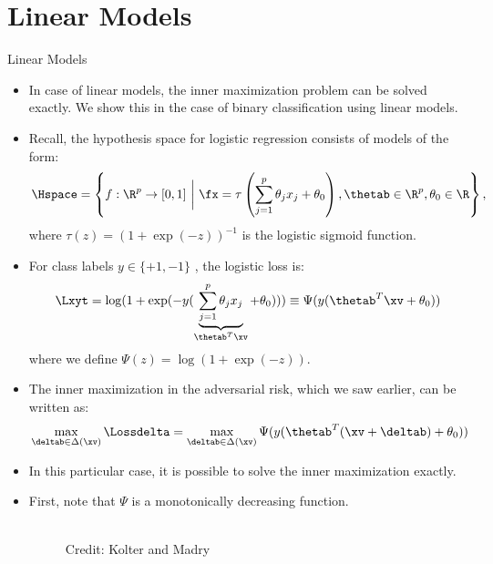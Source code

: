 \section{Linear Models}
\begin{vbframe} {Linear Models}
  \begin{itemize}
    \item In case of linear models, the inner maximization problem can be solved exactly. We show this in the case of binary classification using linear models.
    \item Recall, the hypothesis space for logistic regression consists of models of the form:
          \small
          $$\Hspace = \left\{f: \R^p \to [0, 1] ~\bigg|~ \fx = \tau\left(\sum_{j = 1}^p \theta_j x_j + \theta_0 \right), \thetab \in \R^p, \theta_0 \in \R \right\},$$
          \normalsize
          where $\tau(z) = (1 + \exp(-z))^{-1}$ is the logistic sigmoid function. 
    \item For class labels $y \in \{+1,-1\}$ , the logistic loss is:
          \small
          $$\Lxyt = \log(1 + \exp(- {y (\underbrace{\sum_{j = 1}^p \theta_j x_j}_{\thetab^T\xv} + \theta_0))}) \equiv \Psi(y (\thetab^T\xv + \theta_0))$$
          \normalsize
          where we define $\Psi(z) = \log(1+\exp(-z))$.
  \end{itemize}

\framebreak

  \begin{itemize}
    \item The inner maximization in the adversarial risk, which we saw earlier, can be written as:
    $$\max_{\deltab \in \Delta(\xv)} \Lossdelta = \max_{\deltab \in \Delta(\xv)} \Psi(y (\thetab^T(\xv + \deltab) + \theta_0)) $$
    \item In this particular case, it is possible to solve the inner maximization exactly.
    \item First, note that $\Psi$ is a monotonically decreasing function.
    \begin{figure}
    \centering
      \tiny{\\Credit: Kolter and Madry}
    \end{figure}
  \end{itemize}


\end{vbframe}
